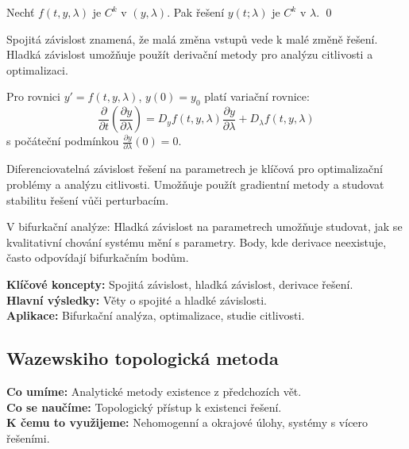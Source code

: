 \begin{theorem}
Nechť $f(t,y,\lambda)$ je $C^k$ v $(y,\lambda)$. Pak řešení $y(t;\lambda)$ je $C^k$ v $\lambda$.
\qed
\end{theorem}

\begin{intuition}
Spojitá závislost znamená, že malá změna vstupů vede k malé změně řešení. Hladká závislost umožňuje použít derivační metody pro analýzu citlivosti a optimalizaci.
\end{intuition}

\begin{example}
Pro rovnici $y' = f(t,y,\lambda)$, $y(0) = y_0$ platí variační rovnice:
\[
\frac{\partial}{\partial t}\left(\frac{\partial y}{\partial\lambda}\right) = D_y f(t,y,\lambda)\frac{\partial y}{\partial\lambda} + D_\lambda f(t,y,\lambda)
\]
s počáteční podmínkou $\frac{\partial y}{\partial\lambda}(0) = 0$.
\end{example}

\begin{keyinsight}
Diferenciovatelná závislost řešení na parametrech je klíčová pro optimalizační problémy a analýzu citlivosti. Umožňuje použít gradientní metody a studovat stabilitu řešení vůči perturbacím.
\end{keyinsight}

\begin{application}
V bifurkační analýze: Hladká závislost na parametrech umožňuje studovat, jak se kvalitativní chování systému mění s parametry. Body, kde derivace neexistuje, často odpovídají bifurkačním bodům.
\end{application}

\begin{summary}
\textbf{Klíčové koncepty:} Spojitá závislost, hladká závislost, derivace řešení. \\
\textbf{Hlavní výsledky:} Věty o spojité a hladké závislosti. \\
\textbf{Aplikace:} Bifurkační analýza, optimalizace, studie citlivosti.
\end{summary}

\spc

\subsection{Wazewskiho topologická metoda}

\begin{scaffold}
\textbf{Co umíme:} Analytické metody existence z předchozích vět. \\
\textbf{Co se naučíme:} Topologický přístup k existenci řešení. \\
\textbf{K čemu to využijeme:} Nehomogenní a okrajové úlohy, systémy s vícero řešeními.
\end{scaffold}

